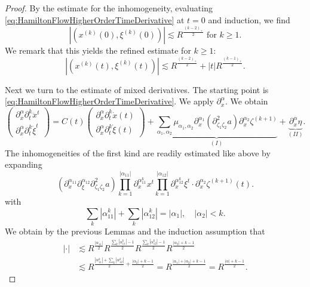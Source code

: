 \documentclass{amsart}
\theoremstyle{definition}
\begin{document}
\begin{proof}
By the estimate for the inhomogeneity, evaluating \eqref{eq:HamiltonFlowHigherOrderTimeDerivative} at $t=0$ and induction, we find
\begin{equation*}
|(x^{(k)}(0),\xi^{(k)}(0))| \lesssim R^{\frac{(k-2)_+}{2}} \text{ for } k \geq 1.
\end{equation*}
We remark that this yields the refined estimate for $k \geq 1$:
\begin{equation*}
|(x^{(k)}(t),\xi^{(k)}(t))| \lesssim R^{\frac{(k-2)_+}{2}} + |t| R^{\frac{(k-1)_+}{2}}.
\end{equation*}

Next we turn to the estimate of mixed derivatives. The starting point is \eqref{eq:HamiltonFlowHigherOrderTimeDerivative}. We apply $\partial_x^{\alpha}$. We obtain
\begin{equation}
\label{eq:MixedDerivativesTimeRegularityI}
\begin{pmatrix}
\partial_x^{\alpha} \partial_t^k \ddot{x}^t \\ \partial_x^{\alpha} \partial_t^k \ddot{\xi}^t
\end{pmatrix}
= C(t) 
\begin{pmatrix}
\partial_x^{\alpha} \partial_t^k \dot{x}(t) \\ \partial_x^{\alpha} \partial_t^k \dot{\xi}(t)
\end{pmatrix}
+ \underbrace{\sum_{\alpha_1,\alpha_2} \mu_{\alpha_1,\alpha_2} \partial_x^{\alpha_1} (\partial^2_{\zeta_1 \zeta_2} a) \partial_x^{\alpha_2} \zeta^{(k+1)}}_{(I)} + \underbrace{\partial_x^{\alpha} \eta}_{(II)}.
\end{equation}
The inhomogeneities of the first kind are readily estimated like above by expanding
\begin{equation*}
(\partial_x^{\alpha_{11}} \partial_{\xi}^{\alpha_{12}} \partial^2_{\zeta_1 \zeta_2} a) \prod_{k=1}^{|\alpha_{11}|} \partial_x^{\alpha_{11}^k} x^t \prod_{k=1}^{|\alpha_{12}|} \partial_x^{\alpha_{12}^k} \xi^t \cdot \partial_x^{\alpha_2} \zeta^{(k+1)}(t).
\end{equation*}
with
\begin{equation*}
\sum_k |\alpha_{11}^k| + \sum_k |\alpha_{12}^k| = |\alpha_1|, \quad |\alpha_2| <k.
\end{equation*}
We obtain by the previous Lemmas and the induction assumption that
\begin{equation*}
\begin{split}
| \cdot | &\lesssim R^{\frac{|\alpha_{11}|}{2}} R^{\frac{\sum_k |\alpha_{11}^k| - 1}{2}} R^{\frac{\sum_k |\alpha_{12}^k| - 1}{2}} R^{\frac{|\alpha_2|+k-1}{2}} \\
&\lesssim R^{\frac{|\alpha_{11}^k| + \sum_k |\alpha_{12}^k|}{2} + \frac{|\alpha_2| + k-1}{2}} = R^{\frac{|\alpha_1| + |\alpha_2| + k-1}{2}} = R^{\frac{|\alpha|+k-1}{2}}. 
\end{split}
\end{equation*}


\end{proof}
\end{document}
